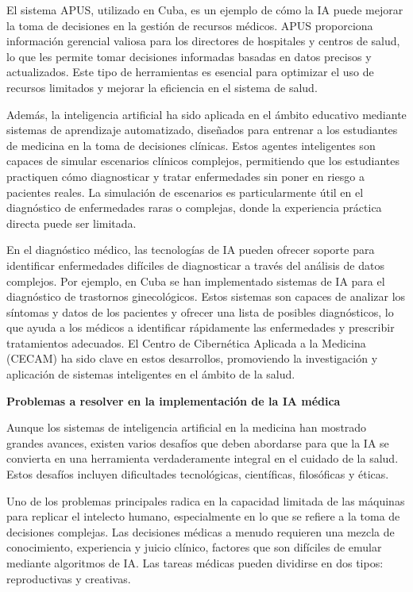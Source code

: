 \documentclass[a4paper,10pt]{article}
\begin{document}
El sistema APUS, utilizado en Cuba, es un ejemplo de cómo la IA puede mejorar la toma de decisiones en la gestión de recursos médicos. APUS proporciona información gerencial valiosa para los directores de hospitales y centros de salud, lo que les permite tomar decisiones informadas basadas en datos precisos y actualizados. Este tipo de herramientas es esencial para optimizar el uso de recursos limitados y mejorar la eficiencia en el sistema de salud.\vspace{1cm}

Además, la inteligencia artificial ha sido aplicada en el ámbito educativo mediante sistemas de aprendizaje automatizado, diseñados para entrenar a los estudiantes de medicina en la toma de decisiones clínicas. Estos agentes inteligentes son capaces de simular escenarios clínicos complejos, permitiendo que los estudiantes practiquen cómo diagnosticar y tratar enfermedades sin poner en riesgo a pacientes reales. La simulación de escenarios es particularmente útil en el diagnóstico de enfermedades raras o complejas, donde la experiencia práctica directa puede ser limitada.\vspace{1cm}

En el diagnóstico médico, las tecnologías de IA pueden ofrecer soporte para identificar enfermedades difíciles de diagnosticar a través del análisis de datos complejos. Por ejemplo, en Cuba se han implementado sistemas de IA para el diagnóstico de trastornos ginecológicos. Estos sistemas son capaces de analizar los síntomas y datos de los pacientes y ofrecer una lista de posibles diagnósticos, lo que ayuda a los médicos a identificar rápidamente las enfermedades y prescribir tratamientos adecuados. El Centro de Cibernética Aplicada a la Medicina (CECAM) ha sido clave en estos desarrollos, promoviendo la investigación y aplicación de sistemas inteligentes en el ámbito de la salud.\vspace{1cm}


\textbf{Problemas a resolver en la implementación de la IA médica}

Aunque los sistemas de inteligencia artificial en la medicina han mostrado grandes avances, existen varios desafíos que deben abordarse para que la IA se convierta en una herramienta verdaderamente integral en el cuidado de la salud. Estos desafíos incluyen dificultades tecnológicas, científicas, filosóficas y éticas.\vspace{1cm}

Uno de los problemas principales radica en la capacidad limitada de las máquinas para replicar el intelecto humano, especialmente en lo que se refiere a la toma de decisiones complejas. Las decisiones médicas a menudo requieren una mezcla de conocimiento, experiencia y juicio clínico, factores que son difíciles de emular mediante algoritmos de IA. Las tareas médicas pueden dividirse en dos tipos: reproductivas y creativas.\vspace{1cm}
\end{document}
